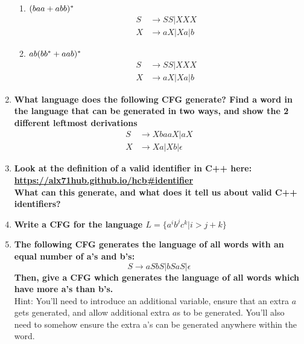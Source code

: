 \begin{enumerate}
\begin{enumerate}
	\item $(baa + abb) {}^\ast$
    \begin{equation*}
      \begin{aligned}
        S &\rightarrow SS | XXX \\
        X &\rightarrow aX | Xa | b
      \end{aligned}
    \end{equation*}
	\item $ab (bb {}^\ast + aab ) {}^\ast$
    \begin{equation*}
      \begin{aligned}
        S &\rightarrow SS | XXX \\
        X &\rightarrow aX | Xa | b
      \end{aligned}
    \end{equation*}
\end{enumerate}


\newpage
\item \textbf{What language does the following CFG generate? Find a word in the language that can be generated in two ways, and show the 2 different leftmost derivations}
    \begin{equation*}
      \begin{aligned}
        S &\rightarrow XbaaX | aX \\
        X &\rightarrow Xa | Xb | \epsilon
      \end{aligned}
    \end{equation*}

\newpage
\item \textbf{Look at the definition of a valid identifier in C++ here:\\
    \url{https://alx71hub.github.io/hcb\#identifier}
    \\
What can this generate, and what does it tell us about valid C++ identifiers?}

\newpage
\item \textbf{Write a CFG for the language $L = \{ a^ib^jc^k | i>j+k\}$
}
\newpage
\item \textbf{The following CFG generates the language of all words with an
equal number of a's and b's:
$$S \rightarrow aSbS | bSaS | \epsilon$$
Then, give a CFG which generates the language of all words which have more
a's than b's.}\\
Hint: You'll need to introduce an additional variable, ensure that an extra
$a$ gets generated, and allow additional extra $a$s to be generated. You'll
also need to somehow ensure the extra a's can be generated anywhere within
the word.


\end{enumerate}
